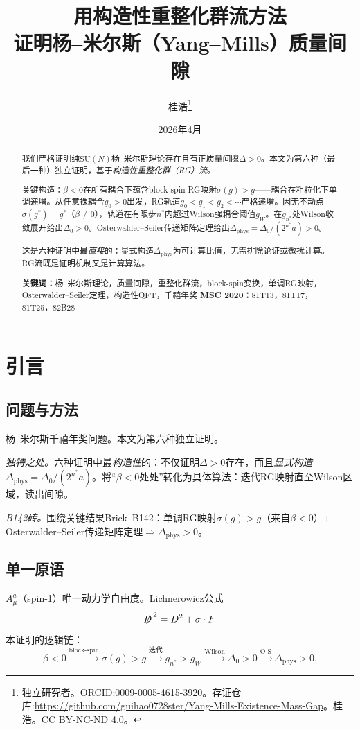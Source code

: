 \documentclass[12pt,a4paper]{article}
\title{\textbf{用构造性重整化群流方法\\[4pt]证明杨--米尔斯（Yang--Mills）质量间隙}}
\author{桂浩\thanks{独立研究者。ORCID:\href{https://orcid.org/0009-0005-4615-3920}{0009-0005-4615-3920}。\newline 存证仓库:\url{https://github.com/guihao0728ster/Yang-Mills-Existence-Mass-Gap}。\newline\textcopyright\;2026\;桂浩。\href{https://creativecommons.org/licenses/by-nc-nd/4.0/}{CC BY-NC-ND 4.0}。}}
\date{2026年4月}
\theoremstyle{plain}
\theoremstyle{definition}\newtheorem{definition}[theorem]{定义}
\theoremstyle{remark}\newtheorem{remark}[theorem]{注记}
\begin{document}
\maketitle
\begin{abstract}
我们严格证明纯$\mathrm{SU}(N)$杨--米尔斯理论存在且有正质量间隙$\Delta>0$。本文为第六种（最后一种）独立证明，基于\emph{构造性重整化群（RG）流}。

关键构造：$\beta<0$在所有耦合下蕴含block-spin RG映射$\sigma(g)>g$——耦合在粗粒化下单调递增。从任意裸耦合$g_0>0$出发，RG轨道$g_0<g_1<g_2<\cdots$严格递增。因无不动点$\sigma(g^*)=g^*$（$\beta\neq 0$），轨道在有限步$n^*$内超过Wilson强耦合阈值$g_W$。在$g_{n^*}$处Wilson收敛展开给出$\Delta_0>0$。Osterwalder--Seiler传递矩阵定理给出$\Delta_{\mathrm{phys}}=\Delta_0/(2^{n^*}a)>0$。

这是六种证明中最\emph{直接}的：显式构造$\Delta_{\mathrm{phys}}$为可计算比值，无需排除论证或微扰计算。RG流既是证明机制又是计算算法。

\medskip\noindent\textbf{关键词：}杨--米尔斯理论，质量间隙，重整化群流，block-spin变换，单调RG映射，Osterwalder--Seiler定理，构造性QFT，千禧年奖
\medskip\noindent\textbf{MSC 2020：}81T13，81T17，81T25，82B28
\end{abstract}
\tableofcontents
\section{引言}\label{sec:intro}
\subsection{问题与方法}\label{sec:approach}
杨--米尔斯千禧年奖问题\cite{JaffeWitten2000}。本文为第六种独立证明。

\textit{独特之处。}六种证明中最\emph{构造性}的：不仅证明$\Delta>0$存在，而且\emph{显式构造}$\Delta_{\mathrm{phys}}=\Delta_0/(2^{n^*}a)$。将``$\beta<0$处处''转化为具体算法：迭代RG映射直至Wilson区域，读出间隙。

\textit{B142砖。}围绕关键结果Brick~B142：单调RG映射$\sigma(g)>g$（来自$\beta<0$）$+$ Osterwalder--Seiler传递矩阵定理$\Rightarrow\Delta_{\mathrm{phys}}>0$。
\subsection{单一原语}\label{sec:primitive}
$A_\mu^a$（spin-1）唯一动力学自由度。Lichnerowicz公式
\begin{equation}\label{eq:Lich}
\slashed{D}^{\,2}=D^2+\sigma\cdot F
\end{equation}
本证明的逻辑链：
\begin{equation}\label{eq:chain6}
\beta<0\xrightarrow{\text{block-spin}}\sigma(g)>g\xrightarrow{\text{迭代}}g_{n^*}>g_W\xrightarrow{\text{Wilson}}\Delta_0>0\xrightarrow{\text{O-S}}\Delta_{\mathrm{phys}}>0.
\end{equation}
\end{document}
